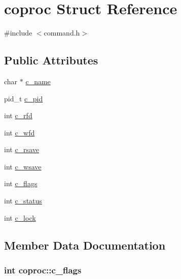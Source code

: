 \hypertarget{structcoproc}{}\section{coproc Struct Reference}
\label{structcoproc}


{\ttfamily \#include $<$command.\+h$>$}

\subsection*{Public Attributes}
\begin{DoxyCompactItemize}
\item 
char $\ast$ \hyperlink{structcoproc_aff6c7c0df15a92848d6ec3024515f02b}{c\+\_\+name}
\item 
pid\+\_\+t \hyperlink{structcoproc_a985b501e47aedaebc0116f4f49e9be41}{c\+\_\+pid}
\item 
int \hyperlink{structcoproc_a20617bf930c55d6fd4de603784331545}{c\+\_\+rfd}
\item 
int \hyperlink{structcoproc_a2c12afc95d8231a2627a08351903425c}{c\+\_\+wfd}
\item 
int \hyperlink{structcoproc_a9fb038976ae82a22c7ba1b418285e17b}{c\+\_\+rsave}
\item 
int \hyperlink{structcoproc_a3c0bb857aacc8176f88f20075e902fd6}{c\+\_\+wsave}
\item 
int \hyperlink{structcoproc_afb0ac3c4ec995790bf72cb0ef27854e6}{c\+\_\+flags}
\item 
int \hyperlink{structcoproc_ab742e5285c2dc8e39fd5b6b89c68522e}{c\+\_\+status}
\item 
int \hyperlink{structcoproc_a34bf762bf4fa2b6f79d9ebc12302819a}{c\+\_\+lock}
\end{DoxyCompactItemize}


\subsection{Member Data Documentation}
\subsubsection[{\texorpdfstring{c\+\_\+flags}{c_flags}}]{\setlength{\rightskip}{0pt plus 5cm}int coproc\+::c\+\_\+flags}\hypertarget{structcoproc_afb0ac3c4ec995790bf72cb0ef27854e6}{}\label{structcoproc_afb0ac3c4ec995790bf72cb0ef27854e6}
